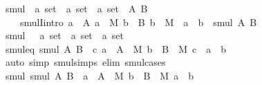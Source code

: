 \begin{isabellebody}
{\isafolddocument}%
%
\isadelimdocument
%
\endisadelimdocument
{}\isamarkupfalse%
\ smul\ {\isacharcolon}{\kern0pt}{\isacharcolon}{\kern0pt}\ {\isachardoublequoteopen}{\isacharprime}{\kern0pt}a\ set\ {\isasymRightarrow}\ {\isacharprime}{\kern0pt}a\ set\ {\isasymRightarrow}\ {\isacharprime}{\kern0pt}a\ set{\isachardoublequoteclose}\ \ A\ B\ \isanewline
\ \ \isanewline
\ \ \ \ smulI{\isacharbrackleft}{\kern0pt}intro{\isacharbrackright}{\kern0pt}{\isacharcolon}{\kern0pt}\ {\isachardoublequoteopen}{\isasymlbrakk}a\ {\isasymin}\ A{\isacharsemicolon}{\kern0pt}\ a\ {\isasymin}\ M{\isacharsemicolon}{\kern0pt}\ b\ {\isasymin}\ B{\isacharsemicolon}{\kern0pt}\ b\ {\isasymin}\ M{\isasymrbrakk}\ {\isasymLongrightarrow}\ a\ {\isasymcdot}\ b\ {\isasymin}\ smul\ A\ B{\isachardoublequoteclose}\isanewline
\isanewline
{}\isamarkupfalse%
\ {\isachardoublequoteopen}smul{\isachardoublequoteclose}\ {\isacharcolon}{\kern0pt}{\isacharcolon}{\kern0pt}\ \ {\isachardoublequoteopen}{\isacharprime}{\kern0pt}a\ set\ {\isasymRightarrow}\ {\isacharprime}{\kern0pt}a\ set\ {\isasymRightarrow}\ {\isacharprime}{\kern0pt}a\ set{\isachardoublequoteclose}\ {\isacharparenleft}{\kern0pt}{\isachardoublequoteopen}{\isacharparenleft}{\kern0pt}{\isacharunderscore}{\kern0pt}\ {\isasymcdots}\ {\isacharunderscore}{\kern0pt}{\isacharparenright}{\kern0pt}{\isachardoublequoteclose}{\isacharparenright}{\kern0pt}\isanewline
\isanewline
{}\isamarkupfalse%
\ smul{\isacharunderscore}{\kern0pt}eq{\isacharcolon}{\kern0pt}\ {\isachardoublequoteopen}smul\ A\ B\ {\isacharequal}{\kern0pt}\ {\isacharbraceleft}{\kern0pt}c{\isachardot}{\kern0pt}\ {\isasymexists}a\ {\isasymin}\ A\ {\isasyminter}\ M{\isachardot}{\kern0pt}\ {\isasymexists}b\ {\isasymin}\ B\ {\isasyminter}\ M{\isachardot}{\kern0pt}\ c\ {\isacharequal}{\kern0pt}\ a\ {\isasymcdot}\ b{\isacharbraceright}{\kern0pt}{\isachardoublequoteclose}\isanewline
%
\isadelimproof
\ \ %
\endisadelimproof
%
\isatagproof
{}\isamarkupfalse%
\ {\isacharparenleft}{\kern0pt}auto\ simp{\isacharcolon}{\kern0pt}\ smul{\isachardot}{\kern0pt}simps\ elim{\isacharbang}{\kern0pt}{\isacharcolon}{\kern0pt}\ smul{\isachardot}{\kern0pt}cases{\isacharparenright}{\kern0pt}%
\endisatagproof
{\isafoldproof}%
%
\isadelimproof
\isanewline
%
\endisadelimproof
\isanewline
{}\isamarkupfalse%
\ smul{\isacharcolon}{\kern0pt}\ {\isachardoublequoteopen}smul\ A\ B\ {\isacharequal}{\kern0pt}\ {\isacharparenleft}{\kern0pt}{\isasymUnion}a\ {\isasymin}\ A\ {\isasyminter}\ M{\isachardot}{\kern0pt}\ {\isasymUnion}b\ {\isasymin}\ B\ {\isasyminter}\ M{\isachardot}{\kern0pt}\ {\isacharbraceleft}{\kern0pt}a\ {\isasymcdot}\ b{\isacharbraceright}{\kern0pt}{\isacharparenright}{\kern0pt}{\isachardoublequoteclose}\isanewline

\end{isabellebody}
